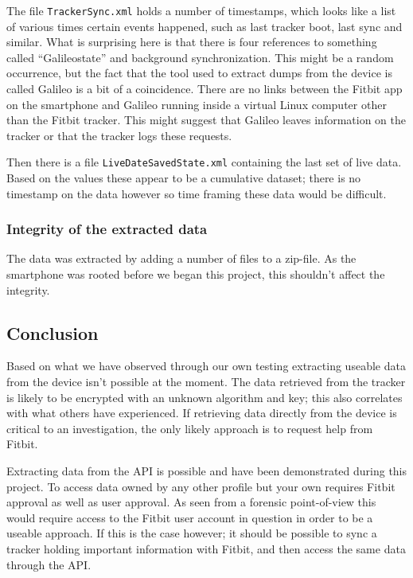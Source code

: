 \documentclass[a4paper,11pt,dvips]{article}
\begin{document}
The file \texttt{TrackerSync.xml} holds a number of timestamps, which looks like a list of various times certain events happened, such as last tracker boot, last sync and similar. What is surprising here is that there is four references to something called “Galileostate” and background synchronization. This might be a random occurrence, but the fact that the tool used to extract dumps from the device is called Galileo is a bit of a coincidence. There are no links between the Fitbit app on the smartphone and Galileo running inside a virtual Linux computer other than the Fitbit tracker. This might suggest that Galileo leaves information on the tracker or that the tracker logs these requests.

Then there is a file \texttt{LiveDateSavedState.xml} containing the last set of live data. Based on the values these appear to be a cumulative dataset; there is no timestamp on the data however so time framing these data would be difficult.

\subsubsection{Integrity of the extracted data}
The data was extracted by adding a number of files to a zip-file. As the smartphone was rooted before we began this project, this shouldn’t affect the integrity.


\subsection{Conclusion}

Based on what we have observed through our own testing extracting useable data from the device isn’t possible at the moment. The data retrieved from the tracker is likely to be encrypted with an unknown algorithm and key; this also correlates with what others have experienced. If retrieving data directly from the device is critical to an investigation, the only likely approach is to request help from Fitbit.

Extracting data from the API is possible and have been demonstrated during this project. To access data owned by any other profile but your own requires Fitbit approval as well as user approval. As seen from a forensic point-of-view this would require access to the Fitbit user account in question in order to be a useable approach. If this is the case however; it should be possible to sync a tracker holding important information with Fitbit, and then access the same data through the API.
\end{document}

